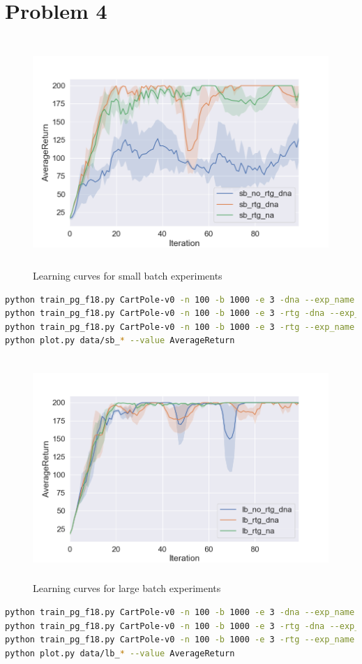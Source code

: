 \documentclass[12pt]{article}
\begin{document}
\section*{Problem 4}
\begin{figure}[H]
  \centering
  \includegraphics[height=3.4in]{p4_1.png}
  \caption{Learning curves for small batch experiments}
\end{figure}
\begin{lstlisting}[language=bash]
python train_pg_f18.py CartPole-v0 -n 100 -b 1000 -e 3 -dna --exp_name sb_no_rtg_dna
python train_pg_f18.py CartPole-v0 -n 100 -b 1000 -e 3 -rtg -dna --exp_name sb_rtg_dna
python train_pg_f18.py CartPole-v0 -n 100 -b 1000 -e 3 -rtg --exp_name sb_rtg_na
python plot.py data/sb_* --value AverageReturn
\end{lstlisting}

\begin{figure}[H]
  \centering
  \includegraphics[height=3.3in]{p4_2.png}
  \caption{Learning curves for large batch experiments}
\end{figure}
\begin{lstlisting}[language=bash]
python train_pg_f18.py CartPole-v0 -n 100 -b 1000 -e 3 -dna --exp_name sb_no_rtg_dna
python train_pg_f18.py CartPole-v0 -n 100 -b 1000 -e 3 -rtg -dna --exp_name sb_rtg_dna
python train_pg_f18.py CartPole-v0 -n 100 -b 1000 -e 3 -rtg --exp_name sb_rtg_na
python plot.py data/lb_* --value AverageReturn
\end{lstlisting}
    
\end{document}
